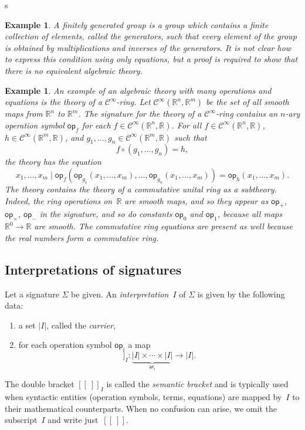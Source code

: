 s\documentclass{amsart}
\newcommand{\RR}{\mathbb{R}} %
\newcommand{\carrier}[1]{|#1|} %
\newcommand{\op}[1]{\mathsf{op}_{#1}} %
\newcommand{\arity}[1]{\mathsf{ar}_{#1}} %
\newcommand{\Cinfty}{\mathcal{C}^\infty}
\newcommand{\sem}[1]{[\![#1]\!]} %
\newtheorem{example}[definition]{Example}
\begin{document}
\begin{example}
  \label{ex:finitely-generated-group}
  A \emph{finitely generated group} is a group which contains a finite collection of
  elements, called the \emph{generators}, such that every element of the group is obtained
  by multiplications and inverses of the generators. It is not clear how to express this
  condition using only equations, but a proof is required to show that there is no
  equivalent algebraic theory.
\end{example}

\begin{example}
  \label{ex:Cinfty-theory}
  An example of an algebraic theory with many operations and equations is the theory of a
  $\Cinfty$-ring. Let $\Cinfty(\RR^n, \RR^m)$ be the set of all smooth maps from $\RR^n$
  to $\RR^m$. The signature for the theory of a $\Cinfty$-ring contains an $n$-ary
  operation symbol $\op{f}$ for each $f \in \Cinfty(\RR^n, \RR)$. For all
  $f \in \Cinfty(\RR^n, \RR)$, $h \in \Cinfty(\RR^m, \RR)$, and
  $g_1, \ldots, g_n \in \Cinfty(\RR^m, \RR)$ such that
  \begin{equation*}
    f \circ (g_1, \ldots, g_n) = h,
  \end{equation*}
  the theory has the equation
  \begin{equation*}
    x_1, \ldots, x_m \mid
    \op{f} (\op{g_1}(x_1, \ldots, x_m), \ldots, \op{g_n}(x_1, \ldots, x_m)) =
    \op{h}(x_1, \ldots, x_m).
  \end{equation*}
  The theory contains the theory of a commutative unital ring as a subtheory. Indeed,
  the ring operations on~$\RR$ are smooth maps, and so they appear as $\op{+}$,
  $\op{\times}$, $\op{-}$ in the signature, and so do constants $\op{0}$ and $\op{1}$,
  because all maps $\RR^0 \to \RR$ are smooth. The commutative ring equations are present
  as well because the real numbers form a commutative ring.
\end{example}


\subsection{Interpretations of signatures}
\label{sec:interp-of-sign}

Let a signature $\Sigma$ be given. An \emph{interpretation~$I$} of $\Sigma$ is given by
the following data:
%
\begin{enumerate}
\item a set $\carrier{I}$, called the \emph{carrier},
\item for each operation symbol $\op{i}$ a map
  \begin{equation*}
    \sem{\op{i}}_I : \underbrace{\carrier{I} \times \cdots \times \carrier{I}}_{\arity{i}} \to \carrier{I}.
  \end{equation*}
\end{enumerate}
%
The double bracket $\sem{{\ }}_I$ is called the \emph{semantic bracket} and is typically
used when syntactic entities (operation symbols, terms, equations) are mapped by~$I$ to
their mathematical counterparts. When no confusion can arise, we omit the subscript~$I$
and write just~$\sem{{\ }}$.
\end{document}
